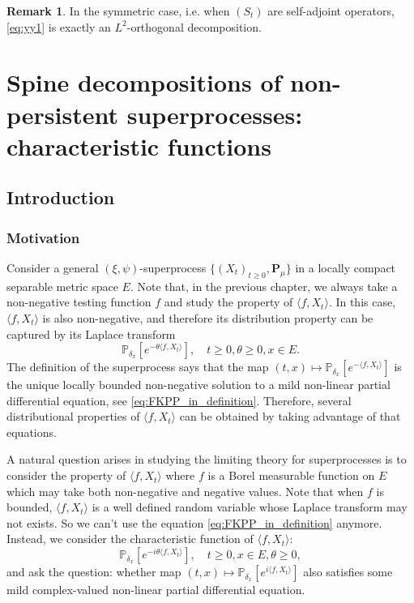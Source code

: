 \documentclass[UTF8]{pkuthss}
\theoremstyle{plain}
\theoremstyle{definition}
\newtheorem{rem}[thm]{Remark}
\numberwithin{equation}{section}
\begin{document}
\begin{rem}
	In the symmetric case, i.e. when $(S_t)$ are self-adjoint operators,  \eqref{eq:yy1} is exactly an $L^2$-orthogonal decomposition.
\end{rem}

\chapter{Spine decompositions of non-persistent superprocesses: characteristic functions}
\section{Introduction}
\subsection{Motivation}
    Consider a general $(\xi,\psi)$-superprocess $\{(X_t)_{t\geq 0}, \mathbf P_\mu\}$ in a locally compact separable metric space $E$.
    Note that, in the previous chapter, we always take a non-negative testing function $f$ and study the property of $\langle f,X_t\rangle$.
    In this case, $\langle f, X_t\rangle$ is also non-negative, and therefore its distribution property can be captured by its Laplace transform 
\[
    \mathbb P_{\delta_x}[e^{-\theta\langle f,X_t\rangle}],\quad t\geq 0, \theta \geq 0, x\in E.
\] 
    The definition of the superprocess says that the map $(t,x)\mapsto \mathbb P_{\delta_x}[e^{- \langle f,X_t\rangle}]$ is the unique locally bounded non-negative solution to a mild non-linear partial differential equation, see \eqref{eq:FKPP_in_definition}.
    Therefore, several distributional properties of $\langle f, X_t\rangle$ can be obtained by taking advantage of that equations.

    A natural question arises in studying the limiting theory for superprocesses is to consider the property of $\langle f,X_t\rangle$ where $f$ is a Borel measurable function on $E$ which may take both non-negative and negative values.
    Note that when $f$ is bounded, $\langle f,X_t\rangle$ is a well defined random variable whose Laplace transform may not exists. 
    So we can't use the equation \eqref{eq:FKPP_in_definition} anymore.
    Instead, we consider the characteristic function of $\langle f,X_t\rangle$:
\[
    \mathbb P_{\delta_x}[e^{-i\theta \langle f,X_t\rangle}],\quad t\geq 0, x\in E, \theta \geq 0,
\]
    and ask the question: whether map $(t,x)\mapsto \mathbb P_{\delta_x}[e^{i\langle f,X_t\rangle}]$ also satisfies some mild complex-valued non-linear partial differential equation.
\end{document}
